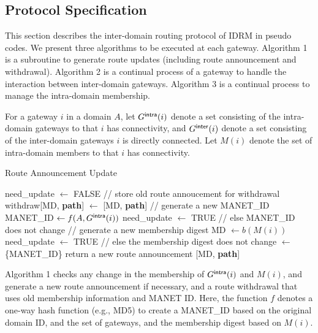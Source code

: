 \subsection{Protocol Specification}
\label{sec::protocol}

This section describes the inter-domain routing protocol of IDRM
in pseudo codes. We present three algorithms to be executed at each
gateway. Algorithm 1 is a subroutine to generate route updates
(including route announcement and withdrawal). Algorithm 2 is a continual process of
a gateway to handle the interaction between inter-domain
gateways. Algorithm 3 is a continual process to manage the
intra-domain membership.

For a gateway $i$ in a domain $A$, let $G^{\sf intra}(i)$ denote a set
consisting of the intra-domain gateways to that $i$ has connectivity,
and $G^{\sf inter}(i)$ denote a set consisting of the inter-domain
gateways $i$ is directly connected. Let $M(i)$ denote the set of
intra-domain members to that $i$ has connectivity.


\begin{algorithm}[htb!]
\caption{Route Announcement Update}
\label{alg:announce}
{\small
\begin{algorithmic}
\STATE need\_update $\leftarrow$ FALSE
\STATE // store old route annoucement for withdrawal
\STATE withdraw[MD, {\bf path}] $\leftarrow$ [MD, {\bf path}]
\ENDIF
{}
\STATE // generate a new MANET\_ID
\STATE MANET\_ID $\leftarrow f(A, G^{\sf intra}(i))$
\STATE need\_update $\leftarrow$ TRUE 
\STATE // else MANET\_ID does not change
\ENDIF
{} 
\STATE // generate a new membership digest
\STATE MD $\leftarrow b(M(i))$
\STATE need\_update $\leftarrow$ TRUE 
\STATE // else the membership digest does not change
\ENDIF
{} $\leftarrow$ \{MANET\_ID\}
\STATE return a new route announcement [MD, {\bf path}]
\end{algorithmic} 
}
\end{algorithm} 


Algorithm 1 checks any change in the membership of $G^{\sf intra}(i)$
and $M(i)$, and generate a new route announcement if necessary, and a
route withdrawal that uses old membership information and MANET
ID. Here, the function $f$ denotes a one-way hash function (e.g., MD5)
to create a MANET\_ID based on the original domain ID, and the set of
gateways, and the membership digest based on $M(i)$.

